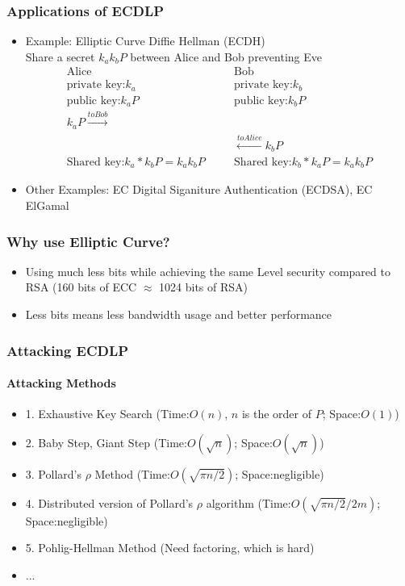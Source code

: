 \documentclass{beamer}
\begin{document}
  \begin{frame}
  	\frametitle{Applications of ECDLP}
  	\begin{itemize}
  		\item Example: Elliptic Curve Diffie Hellman (ECDH)\\
  		Share a secret \alert{$k_ak_bP$} between Alice and Bob preventing Eve
\begin{align*}
& \text{Alice} & \quad & \text{Bob} & \\
& \text{private key:} k_a & \quad & \text{private key:} k_b & \\
& \text{public key:} k_aP & \quad & \text{public key:} k_bP & \\
& k_aP \xrightarrow{to Bob} & \quad &\\
& & \quad & \xleftarrow{to Alice} k_bP & \\
& \text{Shared key:} k_a*k_bP=k_ak_bP & \quad  &\text{Shared key:} k_b*k_aP=k_ak_bP &
\end{align*}
  		\item Other Examples: EC Digital Siganiture Authentication (ECDSA), EC ElGamal
	\end{itemize}
  \end{frame}
  
  \begin{frame}
  	\frametitle{Why use Elliptic Curve?}
	\begin{itemize}
		\item Using much less bits while achieving the same Level security compared to RSA (160 bits of ECC $\approx$ 1024 bits of RSA)\\
		\item Less bits means less bandwidth usage and better performance  
	\end{itemize}	  	
  \end{frame}
  
  \begin{frame}
  	\frametitle{Attacking ECDLP}
  	\framesubtitle{Attacking Methods}
  	\begin{itemize}
  		\item 1. Exhaustive Key Search (Time:$O(n)$, $n$ is the order of $P$; Space:$O(1)$)\\
  		\item 2. Baby Step, Giant Step (Time:$O(\sqrt{n})$; Space:$O(\sqrt{n})$)\\
  		\item 3. Pollard's $\rho$ Method (Time:$O(\sqrt{\pi n/2})$; Space:negligible)\\
  		\item 4. \alert{Distributed version of Pollard's $\rho$ algorithm} (Time:$O(\sqrt{\pi n/2}/2m)$; Space:negligible)\\
  		\item 5. Pohlig-Hellman Method (Need factoring, which is hard)\\
  		\item ...
  	\end{itemize}
  \end{frame}
  
\end{document}
